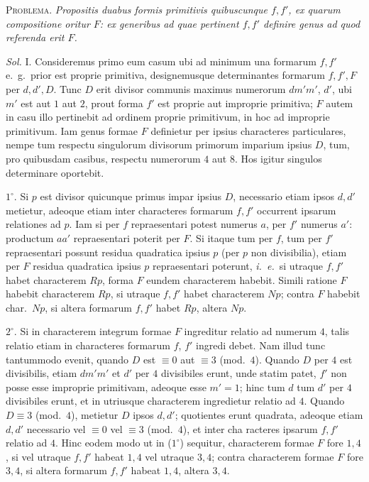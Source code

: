 \textsc{Problema.} \textit{Propositis duabus formis primitivis quibuscunque $f,f'$, ex quarum compositione oritur $F$: ex generibus ad quae pertinent $f,f'$ definire genus ad quod referenda erit $F$.}

\textit{Sol.} I. Consideremus primo eum casum ubi ad minimum una formarum $f,f'$ e.~g.\ prior est proprie primitiva, designemusque determinantes formarum $f,f',F$ per $d,d',D$. Tunc $D$ erit divisor communis maximus numerorum $dm'm'$, $d'$, ubi $m'$ est aut $1$ aut $2$, prout forma $f'$ est proprie aut improprie primitiva; $F$ autem in casu illo pertinebit ad ordinem proprie primitivum, in hoc ad improprie primitivum. Iam genus formae $F$ definietur per ipsius characteres particulares, nempe tum respectu singulorum divisorum primorum imparium ipsius $D$, tum, pro quibusdam casibus, respectu numerorum $4$ aut $8$. Hos igitur singulos determinare oportebit.

$1^{\circ}$. Si $p$ est divisor quicunque primus impar ipsius $D$, necessario etiam ipsos $d,d'$ metietur, adeoque etiam inter characteres formarum $f,f'$ occurrent ipsarum relationes ad $p$. Iam si per $f$ repraesentari potest numerus $a$, per $f'$ numerus $a'$: productum $aa'$ repraesentari poterit per $F$. Si itaque tum per $f$, tum per $f'$ repraesentari possunt residua quadratica ipsius $p$ (per $p$ non divisibilia), etiam per $F$ residua quadratica ipsius $p$ repraesentari poterunt, \textit{i.~e.}\ si utraque $f,f'$ habet characterem $Rp$, forma $F$ eundem characterem habebit. Simili ratione $F$ habebit characterem $Rp$, si utraque $f,f'$ habet characterem $Np$; contra $F$ habebit char.\ $Np$, si altera formarum $f,f'$ habet $Rp$, altera $Np$.

$2^{\circ}$. Si in characterem integrum formae $F$ ingreditur relatio ad numerum $4$, talis relatio etiam in characteres formarum $f$, $f'$ ingredi debet. Nam illud tunc tantummodo evenit, quando $D$ est $\equiv0$ aut $\equiv3$ (mod.\ $4$). Quando $D$ per $4$ est divisibilis, etiam $dm'm'$ et $d'$ per $4$ divisibiles erunt, unde statim patet, $f'$ non posse esse improprie primitivam, adeoque esse $m'=1$; hinc tum $d$ tum $d'$ per $4$ divisibiles erunt, et in utriusque characterem ingredietur relatio ad $4$. Quando $D\equiv3$ (mod.\ $4$), metietur $D$ ipsos $d,d'$; quotientes erunt quadrata, adeoque etiam $d,d'$ necessario vel $\equiv0$ vel $\equiv3$ (mod.\ $4$), et inter cha%
%
racteres ipsarum $f,f'$ relatio ad $4$. Hinc eodem modo ut in ($1^{\circ}$) sequitur, characterem formae $F$ fore $1,4$, si vel utraque $f,f'$ habeat $1,4$ vel utraque $3,4$; contra characterem formae $F$ fore $3,4$, si altera formarum $f,f'$ habeat $1,4$, altera $3,4$.

